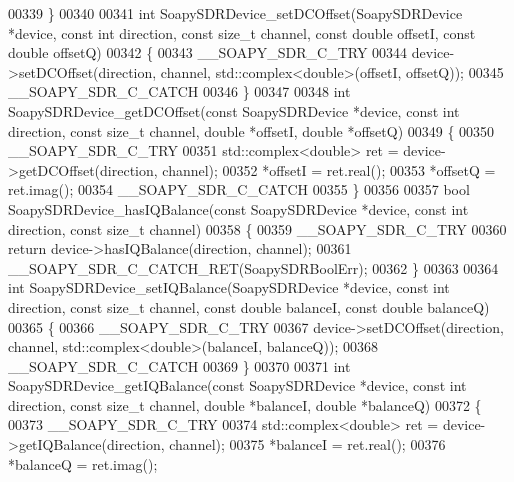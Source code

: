 \begin{DoxyCode}
00339 \}
00340 
00341 \textcolor{keywordtype}{int} SoapySDRDevice_setDCOffset(SoapySDRDevice *device, \textcolor{keyword}{const} \textcolor{keywordtype}{int} direction, \textcolor{keyword}{const} \textcolor{keywordtype}{size\_t} channel, \textcolor{keyword}{const} \textcolor{keywordtype}{
      double} offsetI, \textcolor{keyword}{const} \textcolor{keywordtype}{double} offsetQ)
00342 \{
00343     __SOAPY_SDR_C_TRY
00344     device->setDCOffset(direction, channel, std::complex<double>(offsetI, offsetQ));
00345     __SOAPY_SDR_C_CATCH
00346 \}
00347 
00348 \textcolor{keywordtype}{int} SoapySDRDevice_getDCOffset(\textcolor{keyword}{const} SoapySDRDevice *device, \textcolor{keyword}{const} \textcolor{keywordtype}{int} direction, \textcolor{keyword}{const} \textcolor{keywordtype}{size\_t} channel, \textcolor{keywordtype}{
      double} *offsetI, \textcolor{keywordtype}{double} *offsetQ)
00349 \{
00350     __SOAPY_SDR_C_TRY
00351     std::complex<double> ret = device->getDCOffset(direction, channel);
00352     *offsetI = ret.real();
00353     *offsetQ = ret.imag();
00354     __SOAPY_SDR_C_CATCH
00355 \}
00356 
00357 \textcolor{keywordtype}{bool} SoapySDRDevice_hasIQBalance(\textcolor{keyword}{const} SoapySDRDevice *device, \textcolor{keyword}{const} \textcolor{keywordtype}{int} direction, \textcolor{keyword}{const} \textcolor{keywordtype}{size\_t} channel)
00358 \{
00359     __SOAPY_SDR_C_TRY
00360     \textcolor{keywordflow}{return} device->hasIQBalance(direction, channel);
00361     __SOAPY_SDR_C_CATCH_RET(SoapySDRBoolErr);
00362 \}
00363 
00364 \textcolor{keywordtype}{int} SoapySDRDevice_setIQBalance(SoapySDRDevice *device, \textcolor{keyword}{const} \textcolor{keywordtype}{int} direction, \textcolor{keyword}{const} \textcolor{keywordtype}{size\_t} channel, \textcolor{keyword}{const} \textcolor{keywordtype}{
      double} balanceI, \textcolor{keyword}{const} \textcolor{keywordtype}{double} balanceQ)
00365 \{
00366     __SOAPY_SDR_C_TRY
00367     device->setDCOffset(direction, channel, std::complex<double>(balanceI, balanceQ));
00368     __SOAPY_SDR_C_CATCH
00369 \}
00370 
00371 \textcolor{keywordtype}{int} SoapySDRDevice_getIQBalance(\textcolor{keyword}{const} SoapySDRDevice *device, \textcolor{keyword}{const} \textcolor{keywordtype}{int} direction, \textcolor{keyword}{const} \textcolor{keywordtype}{size\_t} channel, \textcolor{keywordtype}{
      double} *balanceI, \textcolor{keywordtype}{double} *balanceQ)
00372 \{
00373     __SOAPY_SDR_C_TRY
00374     std::complex<double> ret = device->getIQBalance(direction, channel);
00375     *balanceI = ret.real();
00376     *balanceQ = ret.imag();

\end{DoxyCode}
